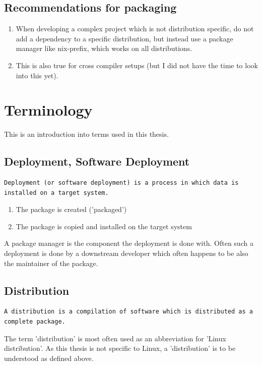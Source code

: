 \documentclass[a4paper,10pt]{article}
\begin{document}
\subsection*{Recommendations for packaging}
\begin{enumerate}
\item When developing a complex project which is not distribution specific, do not add a dependency to a specific distribution, but instead use a package manager like nix-prefix, which works on all distributions.
\item This is also true for cross compiler setups (but I did not have the time to look into this yet).
\end{enumerate}










\newpage
\section{Terminology}
\label{Terminology}
This is an introduction into terms used in this thesis.





\subsection{Deployment, Software Deployment}
\begin{verbatim}
Deployment (or software deployment) is a process in which data is installed on a target system.
\end{verbatim}

\begin{enumerate}
 \item The package is created ('packaged')
 \item The package is copied and installed on the target system
\end{enumerate}

A package manager is the component the deployment is done with. Often such a deployment is done by a downstream developer which often happens to be also the maintainer of the package.







\subsection{Distribution}
\begin{verbatim}
A distribution is a compilation of software which is distributed as a complete package.
\end{verbatim}
The term 'distribution' is most often used as an abbreviation for 'Linux distribution'. As this thesis is not specific to Linux, a 'distribution' is to be understood as defined above.\\
\end{document}
